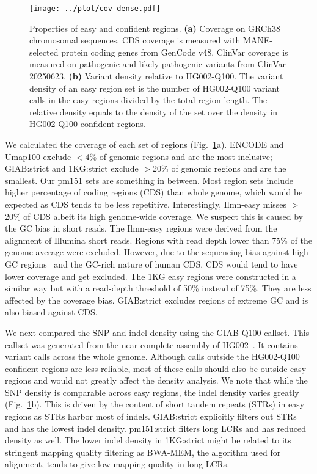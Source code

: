 \documentclass[webpdf,contemporary,large,namedate]{oup-authoring-template}%
\begin{document}
\begin{figure}[tb]
\centering
\texttt{[image: ../plot/cov-dense.pdf]}
\caption{Properties of easy and confident regions.
{\bf (a)} Coverage on GRCh38 chromosomal sequences.
CDS coverage is measured with MANE-selected protein coding genes from GenCode v48.
ClinVar coverage is measured on pathogenic and likely pathogenic variants from ClinVar 20250623.
{\bf (b)} Variant density relative to HG002-Q100.
The variant density of an easy region set is the number of HG002-Q100 variant calls in the easy regions divided by the total region length.
The relative density equals to the density of the set over the density in HG002-Q100 confident regions.
}\label{fig:cov}
\end{figure}

We calculated the coverage of each set of regions (Fig.~\ref{fig:cov}a).
ENCODE and Umap100 exclude $<$4\% of genomic regions and are the most inclusive;
GIAB:strict and 1KG:strict exclude $>$20\% of genomic regions and are the smallest.
Our pm151 sets are something in between.
Most region sets include higher percentage of coding regions (CDS) than whole genome, which would be expected as CDS tends to be less repetitive.
Interestingly, Ilmn-easy misses $>$20\% of CDS albeit its high genome-wide coverage.
We suspect this is caused by the GC bias in short reads.
The Ilmn-easy regions were derived from the alignment of Illumina short reads.
Regions with read depth lower than 75\% of the genome average were excluded.
However, due to the sequencing bias against high-GC regions~\citep{Benjamini:2012aa} and the GC-rich nature of human CDS,
CDS would tend to have lower coverage and get excluded.
The 1KG easy regions were constructed in a similar way but with a read-depth threshold of 50\% instead of 75\%.
They are less affected by the coverage bias.
GIAB:strict excludes regions of extreme GC and is also biased against CDS.

We next compared the SNP and indel density using the GIAB Q100 callset.
This callset was generated from the near complete assembly of HG002~\citep{Rautiainen:2023ab}.
It contains variant calls across the whole genome.
Although calls outside the HG002-Q100 confident regions are less reliable,
most of these calls should also be outside easy regions and would not greatly affect the density analysis.
We note that while the SNP density is comparable across easy regions,
the indel density varies greatly (Fig.~\ref{fig:cov}b).
This is driven by the content of short tandem repeats (STRs) in easy regions as STRs harbor most of indels.
GIAB:strict explicitly filters out STRs and has the lowest indel density.
pm151:strict filters long LCRs and has reduced density as well.
The lower indel density in 1KG:strict might be related to its stringent mapping quality filtering
as BWA-MEM, the algorithm used for alignment, tends to give low mapping quality in long LCRs.
\end{document}
